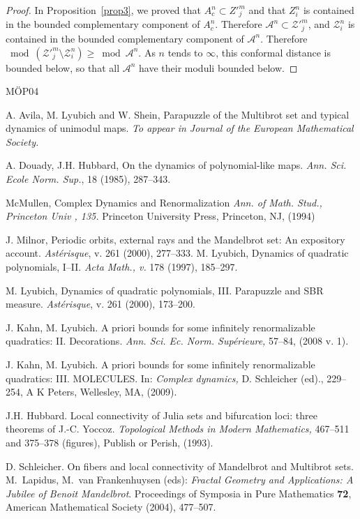\documentclass[12pt,a4paper]{amsart}
\renewcommand{\AA}{\mathcal A}
\newcommand{\ZZ}{\mathcal Z}
\begin{document}
\begin{proof}
In Proposition~\ref{prop3}, we proved that $A^n_c\subset Z'^m_j$ and
that $Z^n_i$ is contained in the bounded complementary component of
$A^n_c$. Therefore $\AA^n\subset\ZZ'^m_j$, and $\ZZ^n_i$ is
contained in the bounded complementary component of $\AA^n$.
Therefore $\bmod(\ZZ'^m_j\setminus \ZZ^n_i)\ge \bmod\AA^n$. As $n$
tends to $\infty$, this conformal distance is bounded below, so that
all $\AA^n$ have their moduli bounded below.
\end{proof}

\newpage

\begin{thebibliography}{M{\"O}P04}



 A. Avila, M. Lyubich and W. Shein, Parapuzzle of
the Multibrot set and typical dynamics of unimodul maps. \textit{To
appear in Journal of the European Mathematical Society.}


 A. Douady,  J.H. Hubbard, On the dynamics of
polynomial-like maps. \textit{Ann. Sci. Ecole Norm. Sup.}, 18
(1985), 287--343.

  McMullen,
  Complex Dynamics and Renormalization
  \textit{Ann. of Math. Stud., Princeton Univ , 135.} Princeton University Press, Princeton, NJ, (1994)

  J. Milnor, Periodic orbits, external rays and the Mandelbrot set:
An expository account.  \textit{Ast\'{e}risque}, v. 261 (2000),
277--333.
M. Lyubich,
  Dynamics of quadratic polynomials, I--II. \textit{Acta Math., v.}
178 (1997), 185--297.

M. Lyubich,
  Dynamics of quadratic polynomials, III. Parapuzzle and SBR measure.
  \textit{Ast\'{e}risque}, v. 261 (2000), 173--200.


J. Kahn,  M. Lyubich. A priori bounds for some infinitely
renormalizable quadratics: II. Decorations. \textit{Ann. Sci. Ec.
Norm. Sup\'erieure,} 57--84, (2008 v. 1).

J. Kahn,  M. Lyubich. A priori bounds for some infinitely
renormalizable quadratics: III. MOLECULES. In: \textit{Complex
dynamics,} D. Schleicher (ed)., 229--254, A K Peters, Wellesley, MA,
(2009).

  J.H. Hubbard. Local connectivity of Julia sets and bifurcation loci: three theorems
of J.-C. Yoccoz. \textit{Topological Methods in Modern Mathematics,}
 467--511 and 375--378 (figures), Publish or Perish,
(1993).


D. Schleicher. On fibers and local connectivity of Mandelbrot and
Multibrot sets.  M.~Lapidus, M.~van Frankenhuysen (eds): {\em
Fractal Geometry and Applications: A Jubilee of Benoit Mandelbrot}.
Proceedings of Symposia in Pure Mathematics {\bf 72}, American
Mathematical Society (2004), 477--507.

\end{thebibliography}
\end{document}
